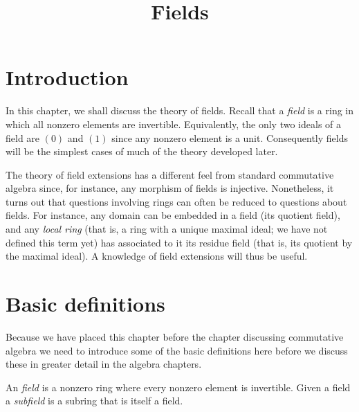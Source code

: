 

%


\title{Fields}


\maketitle

\label{section-phantom}

\tableofcontents


\section{Introduction}
\label{section-introduction}

\noindent
In this chapter, we shall discuss the theory of fields. Recall that a
{\it field} is a ring in which all nonzero elements are invertible.
Equivalently, the only two ideals of a field are $(0)$ and $(1)$
since any nonzero element is a unit. Consequently fields will be the
simplest cases of much of the theory developed later.

\medskip\noindent
The theory of field extensions has a different feel from standard commutative
algebra since, for instance, any morphism of fields is injective. Nonetheless,
it turns out that questions involving rings can often be reduced to questions
about fields. For instance, any domain can be embedded in a field
(its quotient field), and any {\it local ring} (that is, a ring with a unique
maximal ideal; we have not defined this term yet) has associated to it its
residue field (that is, its quotient by the maximal ideal).
A knowledge of field extensions will thus be useful.




\section{Basic definitions}
\label{section-definitions}

\noindent
Because we have placed this chapter before the chapter discussing
commutative algebra we need to introduce some of the basic definitions
here before we discuss these in greater detail in the algebra chapters.

\begin{definition}
\label{definition-field}
An {\it field} is a nonzero ring where every nonzero element is invertible.
Given a field a {\it subfield} is a subring that is itself a field.
\end{definition}

